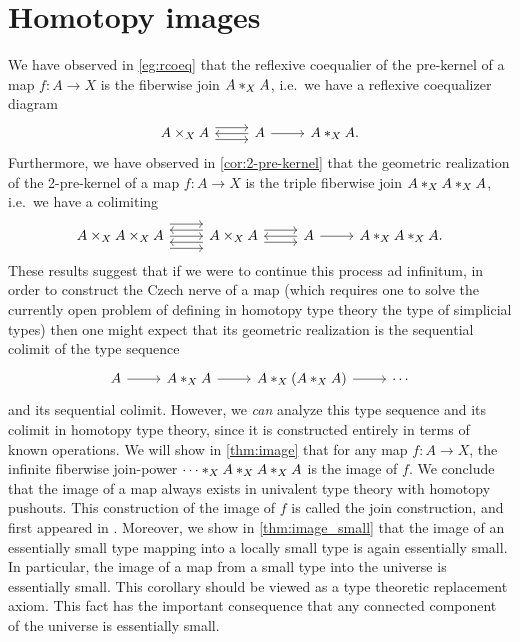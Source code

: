 \chapter{Homotopy images}\label{chap:image}

We have observed in \cref{eg:rcoeq} that the reflexive coequalier of the pre-kernel of a map $f:A\to X$ is the fiberwise join $\join[X]{A}{A}$, i.e.~we have a reflexive coequalizer diagram
\begin{equation*}
\begin{tikzcd}
A\times_X A \arrow[r,yshift=1ex] \arrow[r,yshift=-1ex] & A \arrow[l] \arrow[r] & \join[X]{A}{A}.
\end{tikzcd}
\end{equation*}
Furthermore, we have observed in \cref{cor:2-pre-kernel} that the geometric realization of the 2-pre-kernel of a map $f:A\to X$ is the triple fiberwise join $\join[X]{A}{\join[X]{A}{A}}$, i.e.~we have a colimiting 
\begin{equation*}
\begin{tikzcd}
A\times_{X} A \times_{X} A \arrow[r,yshift=2ex] \arrow[r] \arrow[r,yshift=-2ex] & A \times_X A \arrow[l,yshift=1ex] \arrow[l,yshift=-1ex] \arrow[r,yshift=1ex] \arrow[r,yshift=-1ex] & A \arrow[l] \arrow[r] & \join[X]{A}{\join[X]{A}{A}}.
\end{tikzcd}
\end{equation*}
These results suggest that if we were to continue this process ad infinitum, in order to construct the Czech nerve of a map (which requires one to solve the currently open problem of defining in homotopy type theory the type of simplicial types) then one might expect that its geometric realization is the sequential colimit of the type sequence
\begin{equation*}
\begin{tikzcd}
A \arrow[r] & \join[X]{A}{A} \arrow[r] & \join[X]{A}{(\join[X]{A}{A})} \arrow[r] & \cdots
\end{tikzcd}
\end{equation*}
and its sequential colimit. However, we \emph{can} analyze this type sequence and its colimit in homotopy type theory, since it is constructed entirely in terms of known operations. We will show in \cref{thm:image} that for any map $f:A\to X$, the infinite fiberwise join-power $\join[X]{\cdots}{\join[X]{A}{\join[X]{A}{A}}}$ is the image of $f$. We conclude that the image of a map always exists in univalent type theory with homotopy pushouts. This construction of the image of $f$ is called the join construction, and first appeared in \cite{joinconstruction}. Moreover, we show in \cref{thm:image_small} that the image of an essentially small type mapping into a locally small type is again essentially small. In particular, the image of a map from a small type into the universe is essentially small. This corollary should be viewed as a type theoretic replacement axiom. This fact has the important consequence that any connected component of the universe is essentially small.


